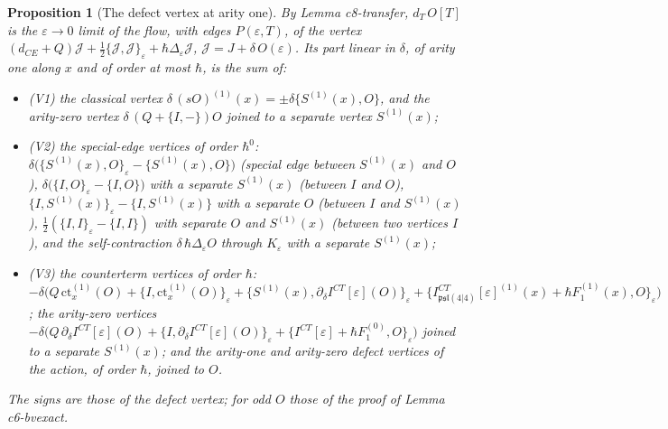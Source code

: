 \documentclass[11pt]{article}
\numberwithin{equation}{section}
\theoremstyle{plain}
\newtheorem{proposition}[theorem]{Proposition}
\theoremstyle{definition}
\begin{document}
\begin{proposition}[The defect vertex at arity one]
\label{prop:qs-defect}
By Lemma c8-transfer, $d_T\,O[T]$ is the $\varepsilon\to0$ limit of the flow, with edges $P(\varepsilon,T)$, of the vertex $(d_{CE}+Q)\mathcal J+\tfrac12\{\mathcal J,\mathcal J\}_\varepsilon+\hbar\Delta_\varepsilon\mathcal J$, $\mathcal J=J+\delta\,O(\varepsilon)$. Its part linear in $\delta$, of arity one along $x$ and of order at most $\hbar$, is the sum of:
\begin{itemize}
\item (V1) the classical vertex $\delta\,(sO)^{(1)}(x)=\pm\delta\{S^{(1)}(x),O\}$, and the arity-zero vertex $\delta\,(Q+\{I,-\})O$ joined to a separate vertex $S^{(1)}(x)$;
\item (V2) the special-edge vertices of order $\hbar^0$: $\delta\big(\{S^{(1)}(x),O\}_\varepsilon-\{S^{(1)}(x),O\}\big)$ (special edge between $S^{(1)}(x)$ and $O$), $\delta\big(\{I,O\}_\varepsilon-\{I,O\}\big)$ with a separate $S^{(1)}(x)$ (between $I$ and $O$), $\{I,S^{(1)}(x)\}_\varepsilon-\{I,S^{(1)}(x)\}$ with a separate $O$ (between $I$ and $S^{(1)}(x)$), $\tfrac12(\{I,I\}_\varepsilon-\{I,I\})$ with separate $O$ and $S^{(1)}(x)$ (between two vertices $I$), and the self-contraction $\delta\,\hbar\Delta_\varepsilon O$ through $K_\varepsilon$ with a separate $S^{(1)}(x)$;
\item (V3) the counterterm vertices of order $\hbar$: $-\delta\big(Q\,\mathrm{ct}^{(1)}_x(O)+\{I,\mathrm{ct}^{(1)}_x(O)\}_\varepsilon+\{S^{(1)}(x),\partial_\delta I^{CT}[\varepsilon](O)\}_\varepsilon+\{I^{CT}_{\mathfrak{psl}(4|4)}[\varepsilon]^{(1)}(x)+\hbar F_1^{(1)}(x),O\}_\varepsilon\big)$; the arity-zero vertices $-\delta\big(Q\,\partial_\delta I^{CT}[\varepsilon](O)+\{I,\partial_\delta I^{CT}[\varepsilon](O)\}_\varepsilon+\{I^{CT}[\varepsilon]+\hbar F_1^{(0)},O\}_\varepsilon\big)$ joined to a separate $S^{(1)}(x)$; and the arity-one and arity-zero defect vertices of the action, of order $\hbar$, joined to $O$.
\end{itemize}
The signs are those of the defect vertex; for odd $O$ those of the proof of Lemma c6-bvexact.
\end{proposition}
\end{document}
